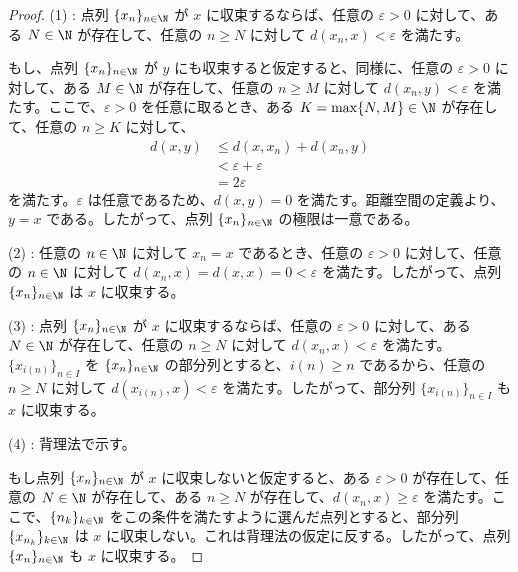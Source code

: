 \documentclass[article,paper=a4paper]{jlreq}
\begin{document}
\begin{proof}
(1) : 点列 $\{x_n\}_{n \in \N}$ が $x$ に収束するならば、任意の $\varepsilon > 0$ に対して、ある $N \in \N$ が存在して、任意の $n \geq N$ に対して $d(x_n,x) < \varepsilon$ を満たす。

もし、点列 $\{x_n\}_{n \in \N}$ が $y$ にも収束すると仮定すると、同様に、任意の $\varepsilon > 0$ に対して、ある $M \in \N$ が存在して、任意の $n \geq M$ に対して $d(x_n,y) < \varepsilon$ を満たす。ここで、$\varepsilon > 0$ を任意に取るとき、ある $K = \max\{N,M\} \in \N$ が存在して、任意の $n \geq K$ に対して、
\begin{align*}
d(x,y) &\leq d(x,x_n) + d(x_n,y) \\
&< \varepsilon + \varepsilon \\
&= 2\varepsilon
\end{align*}
を満たす。$\varepsilon$ は任意であるため、$d(x,y) = 0$ を満たす。距離空間の定義より、$y = x$ である。したがって、点列 $\{x_n\}_{n \in \N}$ の極限は一意である。

\vspace{1\baselineskip}

(2) : 任意の $n \in \N$ に対して $x_n = x$ であるとき、任意の $\varepsilon > 0$ に対して、任意の $n \in \N$ に対して $d(x_n,x) = d(x,x) = 0 < \varepsilon$ を満たす。したがって、点列 $\{x_n\}_{n \in \N}$ は $x$ に収束する。

\vspace{1\baselineskip}

(3) : 点列 $\{x_n\}_{n \in \N}$ が $x$ に収束するならば、任意の $\varepsilon > 0$ に対して、ある $N \in \N$ が存在して、任意の $n \geq N$ に対して $d(x_n,x) < \varepsilon$ を満たす。$\{x_{i(n)}\}_{n \in I}$ を $\{x_n\}_{n \in \N}$ の部分列とすると、$i(n) \geq n$ であるから、任意の $n \geq N$ に対して $d(x_{i(n)},x) < \varepsilon$ を満たす。したがって、部分列 $\{x_{i(n)}\}_{n \in I}$ も $x$ に収束する。

\vspace{1\baselineskip}

(4) : 背理法で示す。

もし点列 $\{x_n\}_{n \in \N}$ が $x$ に収束しないと仮定すると、ある $\varepsilon > 0$ が存在して、任意の $N \in \N$ が存在して、ある $n \geq N$ が存在して、$d(x_n,x) \geq \varepsilon$ を満たす。ここで、$\{n_k\}_{k\in\N}$ をこの条件を満たすように選んだ点列とすると、部分列 $\{x_{n_k}\}_{k\in\N}$ は $x$ に収束しない。これは背理法の仮定に反する。したがって、点列 $\{x_n\}_{n \in \N}$ も $x$ に収束する。

\vspace{1\baselineskip}


\end{proof}
\end{document}
